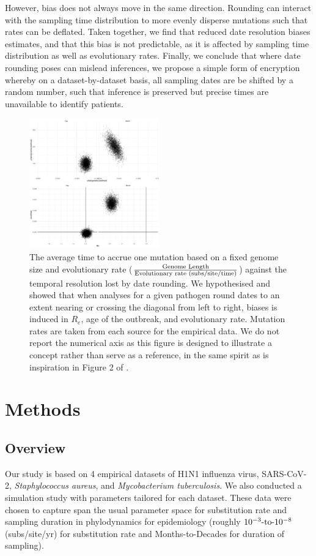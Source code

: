 \documentclass{article}
\begin{document}
\begin{spacing}{1.5}
 However, bias does not always move in the same direction. Rounding can interact with the sampling time distribution to more evenly disperse mutations such that rates can be deflated. Taken together, we find that reduced date resolution biases estimates, and that this bias is not predictable, as it is affected by sampling time distribution as well as evolutionary rates. Finally, we conclude that where date rounding poses can mislead inferences, we propose a simple form of encryption whereby on a dataset-by-dataset basis, all sampling dates are be shifted by a random number, such that inference is preserved but precise times are unavailable to identify patients.

\begin{figure}[!h]
    \centering
    \includegraphics[width = 0.5\textwidth]{plane.pdf}
    \caption{The average time to accrue one mutation based on a fixed genome size and evolutionary rate ($\frac{\textnormal{Genome Length}}{\textnormal{Evolutionary rate (subs/site/time)}}$) against the temporal resolution lost by date rounding. We hypothesised and showed that when analyses for a given pathogen round dates to an extent nearing or crossing the diagonal from left to right, biases is induced in $R_e$, age of the outbreak, and evolutionary rate. Mutation rates are taken from each source for the empirical data. We do not report the numerical axis as this figure is designed to illustrate a concept rather than serve as a reference, in the same spirit as is inspiration in Figure 2 of \citet{biek_measurably_2015}.}
    \label{fig:plane}
\end{figure}


\section*{Methods}
\subsection*{Overview}
Our study is based on 4 empirical datasets of H1N1 influenza virus, SARS-CoV-2, \textit{Staphylococcus aureus}, and \textit{Mycobacterium tuberculosis}. We also conducted a  simulation study with parameters tailored for each dataset. These data were chosen to capture span the usual parameter space for substitution rate and sampling duration in phylodynamics for epidemiology (roughly $10^{-3}\textnormal{-to-}10^{-8}$ (subs/site/yr) for substitution rate and Months-to-Decades for duration of sampling).


\end{spacing}
\end{document}
